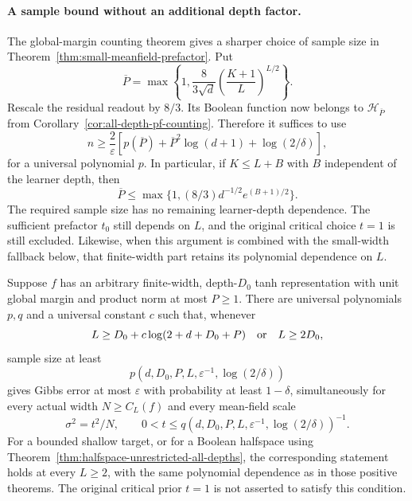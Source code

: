 \paragraph{A sample bound without an additional depth factor.}
The global-margin counting theorem gives a sharper choice of sample
size in Theorem~\ref{thm:small-meanfield-prefactor}. Put
\[
 \overline P=\max\left\{1,\frac8{3\sqrt d}
                  \left(\frac{K+1}{L}\right)^{L/2}\right\}.
\]
Rescale the residual readout by $8/3$. Its Boolean function now belongs
to $\mathcal H_{\overline P}$ from
Corollary~\ref{cor:all-depth-pf-counting}. Therefore it suffices to use
\[
 n\ge\frac2\varepsilon
   \left[p(\overline P)+\overline P^2\log(d+1)
                         +\log(2/\delta)\right],
\]
for a universal polynomial $p$. In particular, if $K\le L+B$ with
$B$ independent of the learner depth, then
\[
 \overline P\le\max\{1,(8/3)d^{-1/2}e^{(B+1)/2}\}.
\]
The required sample size has no remaining learner-depth dependence.
The sufficient prefactor $t_0$ still depends on $L$, and the original
critical choice $t=1$ is still excluded. Likewise, when this argument
is combined with the small-width fallback below, that finite-width
part retains its polynomial dependence on $L$.

\begin{corollary}
\label{cor:small-prefactor-product-targets}
Suppose $f$ has an arbitrary finite-width, depth-$D_0$ tanh
representation with unit global margin and product norm at most
$P\ge1$. There are universal polynomials $p,q$ and a universal
constant $c$ such that, whenever
\[
 L\ge D_0+c\log(2+d+D_0+P)
 \quad\hbox{or}\quad L\ge2D_0,
\]
sample size at least
\[
 p(d,D_0,P,L,\varepsilon^{-1},\log(2/\delta))
\]
gives Gibbs error at most $\varepsilon$ with probability at least
$1-\delta$, simultaneously for every actual width $N\ge C_L(f)$
and every mean-field scale
\[
 \sigma^2=t^2/N,
 \qquad 0<t\le
 q(d,D_0,P,L,\varepsilon^{-1},\log(2/\delta))^{-1}.
\]
For a bounded shallow target, or for a Boolean halfspace using
Theorem~\ref{thm:halfspace-unrestricted-all-depths}, the corresponding
statement holds at every $L\ge2$, with the same polynomial dependence
as in those positive theorems. The original critical prior $t=1$
is not asserted to satisfy this condition.
\end{corollary}

